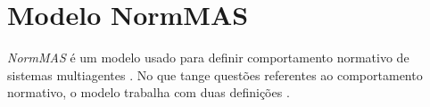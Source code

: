 \section{Modelo NormMAS}
\textit{NormMAS} é um modelo usado para definir comportamento normativo de sistemas multiagentes \cite{normas}. No que tange questões referentes ao 
comportamento normativo, o modelo trabalha com duas definições \cite{normas}.
